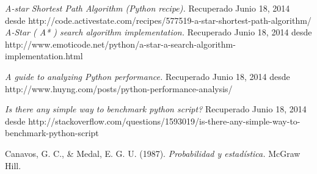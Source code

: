 \documentclass[letter, titlepage, 10pt]{article}
\begin{document}
\begin{thebibliography}{10}
     {\em A-star Shortest Path Algorithm (Python recipe).} Recuperado Junio 18, 2014 desde http://code.activestate.com/recipes/577519-a-star-shortest-path-algorithm/
     {\em A-Star ( A* ) search algorithm implementation.} Recuperado Junio 18, 2014 desde http://www.emoticode.net/python/a-star-a-search-algorithm-implementation.html

     {\em A guide to analyzing Python performance.} Recuperado Junio 18, 2014 desde http://www.huyng.com/posts/python-performance-analysis/
    
     {\em Is there any simple way to benchmark python script?} Recuperado Junio 18, 2014 desde http://stackoverflow.com/questions/1593019/is-there-any-simple-way-to-benchmark-python-script

     Canavos, G. C., \& Medal, E. G. U. (1987). {\em Probabilidad y estadística.} McGraw Hill.

\end{thebibliography}
\end{document}
